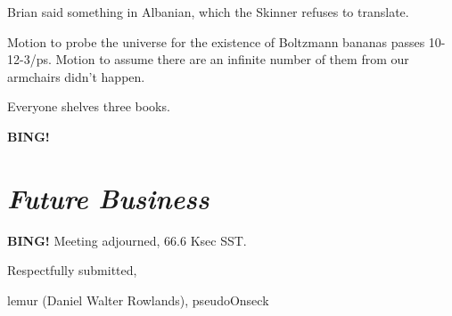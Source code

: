 \documentclass[10pt]{article}
\newcommand{\bing}{{\bf BING!} }
\newcommand{\goto}[1]{\bing \vskip 12pt \section*{{\em{#1}}}}
\newcommand{\onseck}{lemur (Daniel Walter Rowlands), pseudoOnseck}
\begin{document}
Brian said something in Albanian, which the Skinner refuses to translate.

Motion to probe the universe for the existence of Boltzmann bananas passes 10-12-3/ps.
Motion to assume there are an infinite number of them from our armchairs didn't happen.

Everyone shelves three books.

\goto{Future Business}

\bing
\noindent
Meeting adjourned, 66.6 Ksec SST.

\vspace{18pt}

\centerline{Respectfully submitted,}
\centerline{\onseck}
\end{document}
